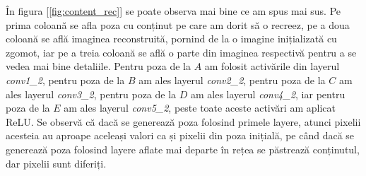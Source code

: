 În figura [\ref{fig:content_rec}] se poate observa mai bine ce am spus mai sus. Pe prima coloană se afla poza cu conținut pe care am dorit să o recreez, pe a doua coloană se află imaginea reconstruită, pornind de la o imagine inițializată cu zgomot, iar pe a treia coloană se află o parte din imaginea respectivă pentru a se vedea mai bine detaliile. Pentru poza de la $A$ am folosit activările din layerul \textit{conv1{\_}2}, pentru poza de la $B$ am ales layerul \textit{conv2{\_}2}, pentru poza de la $C$ am ales layerul \textit{conv3{\_}2}, pentru poza de la $D$ am ales layerul \textit{conv4{\_}2}, iar pentru poza de la $E$ am ales layerul \textit{conv5{\_}2}, peste toate aceste activări am aplicat ReLU. Se observă că dacă se generează poza folosind primele layere, atunci pixelii acesteia au aproape aceleași valori ca și pixelii din poza inițială, pe când dacă se generează poza folosind layere aflate mai departe în rețea se păstrează conținutul, dar pixelii sunt diferiți.

